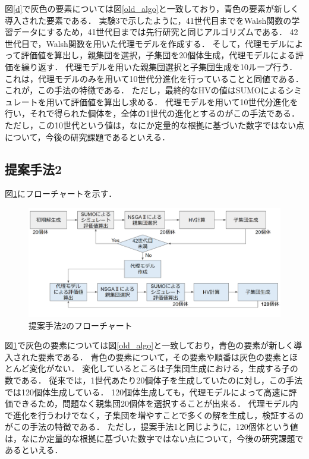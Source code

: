\documentclass[main]{subfiles}
\begin{document}
        図\ref{d}で灰色の要素については図\ref{old_algo}と一致しており，青色の要素が新しく導入された要素である．
        実験3で示したように，41世代目までをWalsh関数の学習データにするため，41世代目までは先行研究と同じアルゴリズムである．
        42世代目で，Walsh関数を用いた代理モデルを作成する．
        そして，代理モデルによって評価値を算出し，親集団を選択，子集団を20個体生成，代理モデルによる評価を繰り返す．
        代理モデルを用いた親集団選択と子集団生成を10ループ行う．
        これは，代理モデルのみを用いて10世代分進化を行っていることと同値である．
        これが，この手法の特徴である．
        ただし，最終的なHVの値はSUMOによるシミュレートを用いて評価値を算出し求める．
        代理モデルを用いて10世代分進化を行い，それで得られた個体を，全体の1世代の進化とするのがこの手法である．
        ただし，この10世代という値は，なにか定量的な根拠に基づいた数字ではない点について，今後の研究課題であるといえる．
        \subsection{提案手法2}
        図\ref{k}にフローチャートを示す．
        \begin{figure}
            \centering
            \includegraphics[width=\linewidth]{figures/k.png}
            \caption{提案手法2のフローチャート}
            \label{k}
        \end{figure}

        図\ref{k}で灰色の要素については図\ref{old_algo}と一致しており，青色の要素が新しく導入された要素である．
        青色の要素について，その要素や順番は灰色の要素とほとんど変化がない．
        変化しているところは子集団生成における，生成する子の数である．
        従来では，1世代あたり20個体子を生成していたのに対し，この手法では120個体生成している．
        120個体生成しても，代理モデルによって高速に評価できるため，問題なく親集団20個体を選択することが出来る．
        代理モデル内で進化を行うわけでなく，子集団を増やすことで多くの解を生成し，検証するのがこの手法の特徴である．
        ただし，提案手法1と同じように，120個体という値は，なにか定量的な根拠に基づいた数字ではない点について，今後の研究課題であるといえる．
\end{document}
